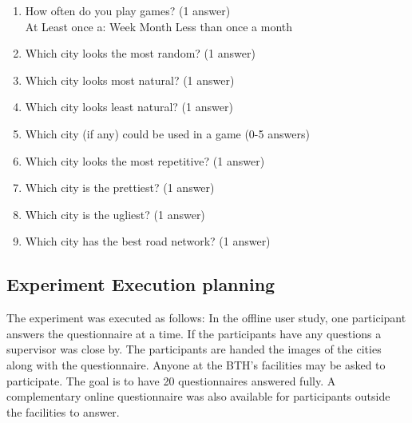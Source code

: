 	\begin{enumerate}
		\item How often do you play games? (1 answer)\\
		At Least once a:	\tab Week \tab Month \tab Less than once a month
		
		\item Which city looks the most random? (1 answer)\\
		    
		
		\item Which city looks most natural? (1 answer)\\
		    
		
		\item Which city looks least natural? (1 answer)\\
		    
		
		\item Which city (if any) could be used in a game (0-5 answers)\\
		    
		
		\item Which city looks the most repetitive? (1 answer)\\
		    
		
		\item Which city is the prettiest? (1 answer)\\
		    
		
		\item Which city is the ugliest? (1 answer)\\
		    
		
		\item Which city has the best road network? (1 answer)\\
		    
	\end{enumerate}
		
	\subsection{Experiment Execution planning}
	The experiment was executed as follows: In the offline user study, one participant answers the questionnaire at a time. If the participants have any questions a supervisor was close by. The participants are handed the images of the cities along with the questionnaire. Anyone at the BTH’s facilities may be asked to participate. The goal is to have 20 questionnaires answered fully. A complementary online questionnaire was also available for participants outside the facilities to answer.
		
